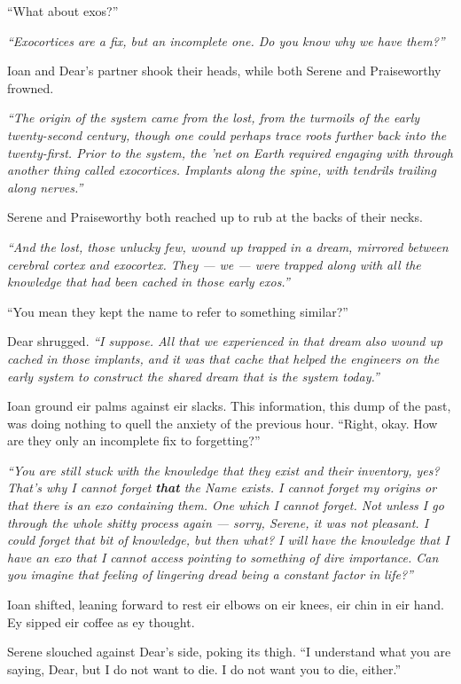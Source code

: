 ``What about exos?''

\emph{``Exocortices are a fix, but an incomplete one. Do you know why we have them?''}

Ioan and Dear's partner shook their heads, while both Serene and Praiseworthy frowned.

\emph{``The origin of the system came from the lost, from the turmoils of the early twenty-second century, though one could perhaps trace roots further back into the twenty-first. Prior to the system, the 'net on Earth required engaging with through another thing called exocortices. Implants along the spine, with tendrils trailing along nerves.''}

Serene and Praiseworthy both reached up to rub at the backs of their necks.

\emph{``And the lost, those unlucky few, wound up trapped in a dream, mirrored between cerebral cortex and exocortex. They — we — were trapped along with all the knowledge that had been cached in those early exos.''}

``You mean they kept the name to refer to something similar?''

Dear shrugged. \emph{``I suppose. All that we experienced in that dream also wound up cached in those implants, and it was that cache that helped the engineers on the early system to construct the shared dream that is the system today.''}

Ioan ground eir palms against eir slacks. This information, this dump of the past, was doing nothing to quell the anxiety of the previous hour. ``Right, okay. How are they only an incomplete fix to forgetting?''

\emph{``You are still stuck with the knowledge that they exist and their inventory, yes? That's why I cannot forget \textbf{that} the Name exists. I cannot forget my origins or that there is an exo containing them. One which I cannot forget. Not unless I go through the whole shitty process again — sorry, Serene, it was not pleasant. I could forget that bit of knowledge, but then what? I will have the knowledge that I have an exo that I cannot access pointing to something of dire importance. Can you imagine that feeling of lingering dread being a constant factor in life?''}

Ioan shifted, leaning forward to rest eir elbows on eir knees, eir chin in eir hand. Ey sipped eir coffee as ey thought.

Serene slouched against Dear's side, poking its thigh. ``I understand what you are saying, Dear, but I do not want to die. I do not want you to die, either.''

